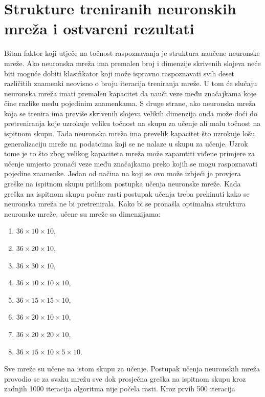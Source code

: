 \section{Strukture treniranih neuronskih mreža i ostvareni rezultati}
\label{sec:strukture-treniranih-neuronskih-mreza-i-ostvareni-rezultati}
Bitan faktor koji utječe na točnost raspoznavanja je struktura naučene neuronske mreže. Ako neuronska mreža ima premalen
broj i dimenzije skrivenih slojeva neće biti moguće dobiti klasifikator koji može ispravno raspoznavati svih deset
različitih znamenki neovisno o broju iteracija treniranja mreže. U tom će slučaju neuronska mreža imati premalen
kapacitet da nauči veze među značajkama koje čine razlike među pojedinim znamenkama. S druge strane, ako neuronska mreža
koja se trenira ima previše skrivenih slojeva velikih dimenzija onda može doći do pretreniranja koje uzrokuje veliku
točnost na skupu za učenje ali malu točnost na ispitnom skupu. Tada neuronska mreža ima prevelik kapacitet što
uzrokuje lošu generalizaciju mreže na podatcima koji se ne nalaze u skupu za učenje. Uzrok tome je to što zbog velikog
kapaciteta mreža može zapamtiti viđene primjere za učenje umjesto pronaći veze među značajkama preko kojih se mogu
raspoznavati pojedine znamenke. Jedan od načina na koji se ovo može izbjeći je provjera greške na ispitnom skupu
prilikom postupka učenja neuronske mreže. Kada greška na ispitnom skupu počne rasti postupak učenja treba prekinuti kako
se neuronska mreža ne bi pretrenirala. Kako bi se pronašla optimalna struktura neuronske mreže, učene su mreže sa
dimenzijama:
\begin{enumerate}
    \item $36 \times 10 \times 10$,
    \item $36 \times 20 \times 10$,
    \item $36 \times 30 \times 10$,
    \item $36 \times 10 \times 10 \times 10$,
    \item $36 \times 15 \times 15 \times 10$,
    \item $36 \times 20 \times 10 \times 10$,
    \item $36 \times 20 \times 20 \times 10$,
    \item $36 \times 15 \times 10 \times 5 \times 10$.
\end{enumerate}
Sve mreže su učene na istom skupu za učenje. Postupak učenja neuronskih mreža provodio se za svaku mrežu sve dok
prosječna greška na ispitnom skupu kroz zadnjih 1000 iteracija algoritma nije počela rasti. Kroz prvih 500 iteracija
